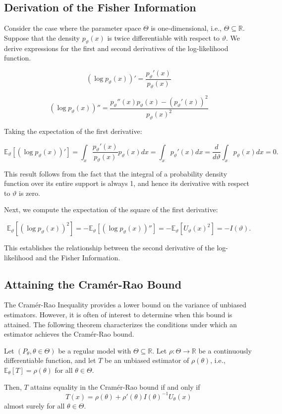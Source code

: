 \documentclass[open=any, 11pt,paper=A4]{scrreprt}
\begin{document}
\subsection*{Derivation of the Fisher Information}

Consider the case where the parameter space \(\Theta\) is one-dimensional, i.e., \(\Theta \subseteq \mathbb{R}\). Suppose that the density \(p_\vartheta(x)\) is twice differentiable with respect to \(\vartheta\). We derive expressions for the first and second derivatives of the log-likelihood function.

\[
\left( \log p_\vartheta(x) \right)' = \frac{p_\vartheta'(x)}{p_\vartheta(x)}
\]

\[
\left( \log p_\vartheta(x) \right)'' = \frac{p_\vartheta''(x)p_\vartheta(x) - \left( p_\vartheta'(x) \right)^2}{p_\vartheta(x)^2}
\]

Taking the expectation of the first derivative:

\[
\mathbb{E}_\vartheta \left[ \left( \log p_\vartheta(x) \right)' \right] = \int_x \frac{p_\vartheta'(x)}{p_\vartheta(x)} p_\vartheta(x) dx = \int_x p_\vartheta'(x) dx = \frac{d}{d\vartheta} \int_x p_\vartheta(x) dx = 0.
\]

This result follows from the fact that the integral of a probability density function over its entire support is always 1, and hence its derivative with respect to \(\vartheta\) is zero.

Next, we compute the expectation of the square of the first derivative:

\[
\mathbb{E}_\vartheta \left[ \left( \log p_\vartheta(x) \right)^2 \right] = - \mathbb{E}_\vartheta \left[ \left( \log p_\vartheta(x) \right)'' \right] = - \mathbb{E}_\vartheta \left[ U_\vartheta(x)^2 \right] = - I(\vartheta).
\]

This establishes the relationship between the second derivative of the log-likelihood and the Fisher Information.

\subsection*{Attaining the Cramér-Rao Bound}

The Cramér-Rao Inequality provides a lower bound on the variance of unbiased estimators. However, it is often of interest to determine when this bound is attained. The following theorem characterizes the conditions under which an estimator achieves the Cramér-Rao bound.

\begin{theorem}
    Let \((P_\theta, \theta \in \Theta)\) be a regular model with \(\Theta \subseteq \mathbb{R}\). Let \(\rho: \Theta \to \mathbb{R}\) be a continuously differentiable function, and let \(T\) be an unbiased estimator of \(\rho(\theta)\), i.e., \(\mathbb{E}_\theta[T] = \rho(\theta)\) for all \(\theta \in \Theta\).

    Then, \(T\) attains equality in the Cramér-Rao bound if and only if
    \[
    T(x) = \rho(\theta) + \rho'(\theta) I(\theta)^{-1} U_\theta(x)
    \]
    almost surely for all \(\theta \in \Theta\).
\end{theorem}
\end{document}

